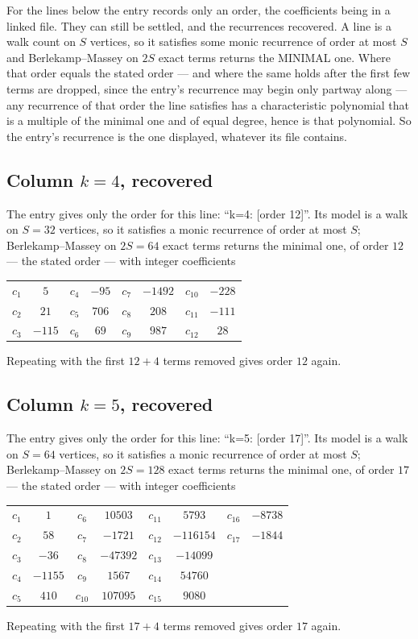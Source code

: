 \documentclass[11pt,a4paper]{article}
\theoremstyle{plain}
\theoremstyle{definition}
\begin{document}
For the lines below the entry records only an order, the coefficients being in a linked file.
They can still be settled, and the recurrences recovered. A line is a walk count on $S$
vertices, so it satisfies some monic recurrence of order at most $S$ and Berlekamp--Massey on
$2S$ exact terms returns the MINIMAL one. Where that order equals the stated order --- and
where the same holds after the first few terms are dropped, since the entry's recurrence may
begin only partway along --- any recurrence of that order the line satisfies has a
characteristic polynomial that is a multiple of the minimal one and of equal degree, hence is
that polynomial. So the entry's recurrence is the one displayed, whatever its file contains.

\subsection*{Column $k=4$, recovered}
The entry gives only the order for this line: ``k=4: [order 12]''. Its model is a walk on
$S=32$ vertices, so it satisfies a monic recurrence of order at most $S$;
Berlekamp--Massey on $2S=64$ exact terms returns the minimal one, of order
$12$ --- the stated order --- with integer coefficients
\begin{center}\small\begin{tabular}{cccccccc}
$c_{1}$ & $5$ & $c_{4}$ & $-95$ & $c_{7}$ & $-1492$ & $c_{10}$ & $-228$ \\
$c_{2}$ & $21$ & $c_{5}$ & $706$ & $c_{8}$ & $208$ & $c_{11}$ & $-111$ \\
$c_{3}$ & $-115$ & $c_{6}$ & $69$ & $c_{9}$ & $987$ & $c_{12}$ & $28$ \\
\end{tabular}\end{center}
Repeating with the first $12+4$ terms removed gives order $12$ again.

\subsection*{Column $k=5$, recovered}
The entry gives only the order for this line: ``k=5: [order 17]''. Its model is a walk on
$S=64$ vertices, so it satisfies a monic recurrence of order at most $S$;
Berlekamp--Massey on $2S=128$ exact terms returns the minimal one, of order
$17$ --- the stated order --- with integer coefficients
\begin{center}\small\begin{tabular}{cccccccc}
$c_{1}$ & $1$ & $c_{6}$ & $10503$ & $c_{11}$ & $5793$ & $c_{16}$ & $-8738$ \\
$c_{2}$ & $58$ & $c_{7}$ & $-1721$ & $c_{12}$ & $-116154$ & $c_{17}$ & $-1844$ \\
$c_{3}$ & $-36$ & $c_{8}$ & $-47392$ & $c_{13}$ & $-14099$ &  &  \\
$c_{4}$ & $-1155$ & $c_{9}$ & $1567$ & $c_{14}$ & $54760$ &  &  \\
$c_{5}$ & $410$ & $c_{10}$ & $107095$ & $c_{15}$ & $9080$ &  &  \\
\end{tabular}\end{center}
Repeating with the first $17+4$ terms removed gives order $17$ again.
\end{document}
